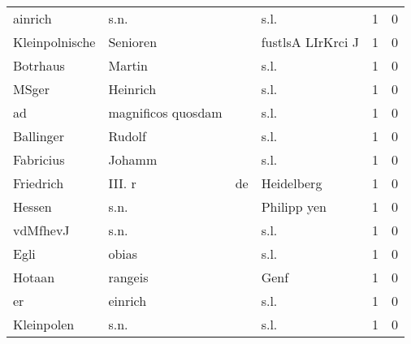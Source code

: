 \begin{tabular}{llllrr}
                  ainrich &                               s.n. &             &                                        s.l. &          1 &         0 \\
           Kleinpolnische &                           Senioren &             &                           fustlsA LIrKrci J &          1 &         0 \\
                 Botrhaus &                             Martin &             &                                        s.l. &          1 &         0 \\
                    MSger &                           Heinrich &             &                                        s.l. &          1 &         0 \\
                       ad &                 magnificos quosdam &             &                                        s.l. &          1 &         0 \\
                Ballinger &                             Rudolf &             &                                        s.l. &          1 &         0 \\
                Fabricius &                             Johamm &             &                                        s.l. &          1 &         0 \\
                Friedrich &                             III. r &          de &                                  Heidelberg &          1 &         0 \\
                   Hessen &                               s.n. &             &                                 Philipp yen &          1 &         0 \\
                 vdMfhevJ &                               s.n. &             &                                        s.l. &          1 &         0 \\
                     Egli &                              obias &             &                                        s.l. &          1 &         0 \\
                   Hotaan &                            rangeis &             &                                        Genf &          1 &         0 \\
                       er &                            einrich &             &                                        s.l. &          1 &         0 \\
               Kleinpolen &                               s.n. &             &                                        s.l. &          1 &         0 \\

\end{tabular}
